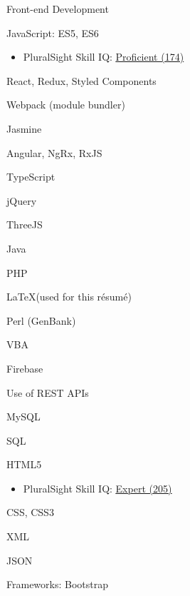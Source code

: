\documentclass[]{deedy-resume-openfont}
\begin{document}
\descript{}
\begin{tightemize}
\item Front-end Development\footnotemark[\value{footnote}]
\end{tightemize}
\sectionsep

\descript{}
\begin{tightemize}
\item JavaScript\footnotemark[\value{footnote}]: ES5, ES6
\begin{itemize}
\item PluralSight Skill IQ: \href{https://app.pluralsight.com/profile/alexander-koik-cesto}{\underline{Proficient (174)}}
\end{itemize}
\item React\footnotemark[\value{footnote}], Redux, Styled Components
\item Webpack (module bundler)
\item Jasmine
\item Angular\footnotemark[\value{footnote}], NgRx, RxJS
\item TypeScript
\item jQuery\footnotemark[\value{footnote}]
\item ThreeJS
\item Java
\item PHP\footnotemark[\value{footnote}]
\item \LaTeX \xspace (used for this r\'esum\'e)
\item Perl (GenBank)
\item VBA\footnotemark[\value{footnote}]
\end{tightemize}
\sectionsep

\descript{}
\begin{tightemize}
\item Firebase
\item Use of REST APIs
\end{tightemize}
\sectionsep

\descript{}
\begin{tightemize}
\item MySQL\footnotemark[\value{footnote}]
\item SQL
\end{tightemize}
\sectionsep

\descript{}
\begin{tightemize}
\item HTML5\footnotemark[\value{footnote}]
\begin{itemize}
\item PluralSight Skill IQ: \href{https://app.pluralsight.com/profile/alexander-koik-cesto}{\underline{Expert (205)}}
\end{itemize}
\item CSS\footnotemark[\value{footnote}], CSS3
\item XML
\item JSON\footnotemark[\value{footnote}]
\item Frameworks: Bootstrap
\end{tightemize}
\sectionsep
\end{document}

